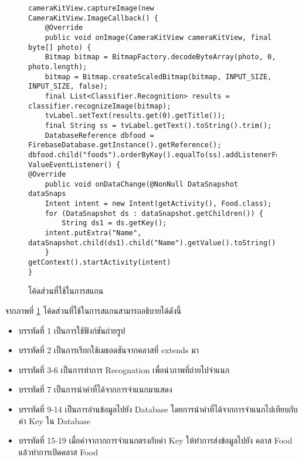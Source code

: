 	\begin{figure}[H]
		{\begin{lstlisting}
cameraKitView.captureImage(new CameraKitView.ImageCallback() {
	@Override
	public void onImage(CameraKitView cameraKitView, final byte[] photo) {
	Bitmap bitmap = BitmapFactory.decodeByteArray(photo, 0, photo.length);
	bitmap = Bitmap.createScaledBitmap(bitmap, INPUT_SIZE, INPUT_SIZE, false);
	final List<Classifier.Recognition> results = classifier.recognizeImage(bitmap);
	tvLabel.setText(results.get(0).getTitle());
	final String ss = tvLabel.getText().toString().trim();
	DatabaseReference dbfood = FirebaseDatabase.getInstance().getReference();
dbfood.child("foods").orderByKey().equalTo(ss).addListenerForSingleValueEvent(new ValueEventListener() {
@Override
	public void onDataChange(@NonNull DataSnapshot dataSnaps
	Intent intent = new Intent(getActivity(), Food.class);
	for (DataSnapshot ds : dataSnapshot.getChildren()) {
		String ds1 = ds.getKey();
	intent.putExtra("Name", dataSnapshot.child(ds1).child("Name").getValue().toString());
	}
getContext().startActivity(intent)
}
\end{lstlisting}}
		\caption{โค้ดส่วนที่ใช้ในการสแกน}
		\label{Fig:ScanFragment2}
	\end{figure}
	\newpage
	จากภาพที่ \ref{Fig:ScanFragment2} โค้ดส่วนที่ใช้ในการสแกนสามารถอธิบายได้ดังนี้
	\begin{itemize}[label={--}]
		\item บรรทัดที่ 1  เป็นการใช้ฟังก์ชันถ่ายรูป
		\item บรรทัดที่ 2  เป็นการเรียกใช้เมธอดชันจากคลาสที่ extends มา 
		\item บรรทัดที่ 3-6 เป็นการทำการ Recognation เพื่อนำภาพที่ถ่ายไปจำแนก
		\item บรรทัดที่ 7  เป็นการนำค่าที่ได้จากการจำแนกมาแสดง
		\item บรรทัดที่ 9-14  เป็นการอ่านข้อมูลไปยัง Database โดยการนำค่าที่ได้จากการจำแนกไปเทียบกับค่า Key ใน Database 
		\item บรรทัดที่ 15-19 เมื่อค่าจากากการจำแนกตรงกับค่า Key ให้ทำการส่งข้อมูลไปยัง คลาส Food แล้วทำการเปิดคลาส Food
	\end{itemize}





